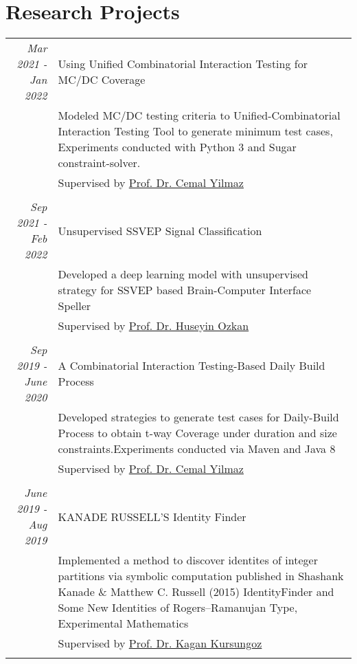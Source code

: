 \documentclass[a4paper,10pt]{article} %
\begin{document}

\section{Research Projects}

\begin{longtable}{r|p{11cm}}
\emph{Mar 2021 - Jan 2022} & Using Unified Combinatorial Interaction Testing for MC/DC Coverage\\
& \footnotesize{Modeled MC/DC testing criteria to Unified-Combinatorial Interaction Testing Tool to generate minimum test cases, \newline Experiments conducted with Python 3 and Sugar constraint-solver.}\\
& \footnotesize{Supervised by \href{mailto:cyilmaz@sabanciuniv.edu}{Prof. Dr. Cemal Yilmaz}}\\
\multicolumn{2}{c}{} \\

\emph{Sep 2021 - Feb 2022} & Unsupervised SSVEP Signal Classification\\
& \footnotesize{Developed a deep learning model with unsupervised strategy for SSVEP based Brain-Computer Interface Speller}\\
& \footnotesize{Supervised by \href{mailto:hozkan@sabanciuniv.edu}{Prof. Dr. Huseyin Ozkan}}\\
\multicolumn{2}{c}{} \\

\emph{Sep 2019 - June 2020} & A Combinatorial Interaction Testing-Based Daily Build Process\\
& \footnotesize{Developed strategies to generate test cases for Daily-Build Process to obtain t-way Coverage under duration and size constraints.\newline Experiments conducted via Maven and Java 8}\\
& \footnotesize{Supervised by \href{mailto:cyilmaz@sabanciuniv.edu}{Prof. Dr. Cemal Yilmaz}}\\
\multicolumn{2}{c}{} \\

\emph{June 2019 - Aug 2019} & KANADE RUSSELL’S Identity Finder\\
& \footnotesize{Implemented a method to discover identites of integer partitions via symbolic computation  published in Shashank Kanade \& Matthew C. Russell (2015) IdentityFinder and Some New Identities of Rogers–Ramanujan Type, Experimental Mathematics}\\
& \footnotesize{Supervised by \href{mailto:kursungoz@sabanciuniv.edu }{Prof. Dr. Kagan Kursungoz}}\\
\multicolumn{2}{c}{} \\

\end{longtable}
\end{document}
